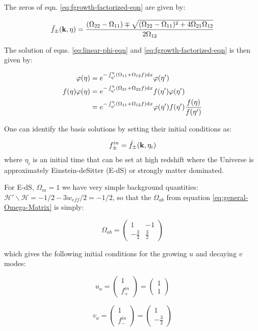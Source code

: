 The zeros of eqn. \ref{eq:fgrowth-factorized-eqn} are given by:

\begin{equation}
\bar{f}_{\pm}(\mathbf{k},\eta)=\frac{(\Omega_{22}-\Omega_{11})\mp\sqrt{(\Omega_{22}-\Omega_{11})^{2}+4\Omega_{21}\Omega_{12}}}{2\Omega_{12}}\label{eq:2.4}
\end{equation}


The solution of eqns. \ref{eq:linear-phi-eqn} and \ref{eq:fgrowth-factorized-eqn}
is then given by:

\begin{align*}
\varphi(\eta) & =e^{-\int_{\eta'}^{\eta}(\Omega_{11}+\Omega_{12}f)\mathrm{d} x}\varphi(\eta')\\
f(\eta)\varphi(\eta) & =e^{-\int_{\eta'}^{\eta}(\Omega_{21}+\Omega_{22}f)\mathrm{d} x}f(\eta')\varphi(\eta')\\
 & =e^{-\int_{\eta'}^{\eta}(\Omega_{11}+\Omega_{12}f)\mathrm{d} x}\varphi(\eta')f(\eta')\frac{f(\eta)}{f(\eta')}
\end{align*}


One can identify the basis solutions by setting their initial conditions
as:

\[
f_{\pm}^{in}=\bar{f}_{\pm}(\mathbf{k},\eta_{i})
\]
where $\eta_{i}$ is an initial time that can be set at high redshift
where the Universe is approximately Einstein-deSitter (E-dS) or strongly
matter dominated.

For E-dS, $\Omega_{m}=1$ we have very simple background quantities:
$\mathcal{H}'\backslash\mathcal{H}=-1/2-3w_{eff}/2=-1/2$, so that
the $\Omega_{ab}$ from equation \ref{eq:general-Omega-Matrix} is
simply:

\[
\Omega_{ab}=\begin{pmatrix}1 & -1\\
-\frac{3}{2} & \frac{3}{2}
\end{pmatrix}
\]


which gives the following initial conditions for the growing $u$
and decaying $v$ modes:

\[
u_{a}=\begin{pmatrix}1\\
f_{+}^{in}
\end{pmatrix}=\begin{pmatrix}1\\
1
\end{pmatrix}
\]


\[
v_{a}=\begin{pmatrix}1\\
f_{-}^{in}
\end{pmatrix}=\begin{pmatrix}1\\
-\frac{3}{2}
\end{pmatrix}
\]


